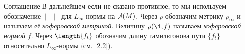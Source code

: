 \begin{ex*}{Соглашение}
В дальнейшем если не сказано противное, то мы используем обозначение \index[symb]{$\lVert\ \rVert$}\index[symb]{$\|\ \|$}$\|\ \|$ для $L_\infty$-нормы на $\mathcal{A}(M)$.
Через $\rho$ обозначим метрику $\rho_\infty$ и называем её \emph{хоферовской метрикой}.
Величину $\rho (\1, f)$ называем \emph{хоферовской нормой} $f$.
Через $\length \{f_t\}$ обозначим длину гамильтонова пути $\{f_t\}$ относительно $L_\infty$-нормы (см. \ref{2.2}).
\end{ex*}
